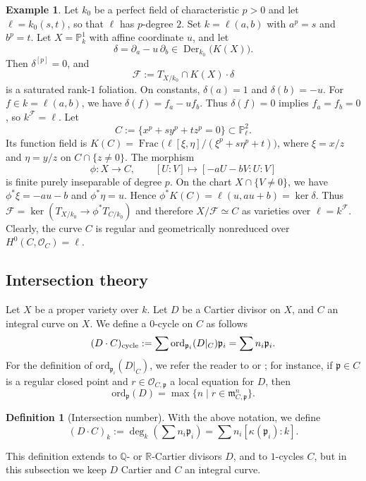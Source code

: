 \documentclass[reqno,oneside]{amsart}
\theoremstyle{definition}
\newtheorem{definition}[theorem]{Definition}
\newtheorem{example}[theorem]{Example}
\theoremstyle{plain}
\numberwithin{equation}{section}
\begin{document}
\begin{example}\label{example-foliation-geo-nonred-curve}
  Let $k_0$ be a perfect field of characteristic $p>0$ and let $\ell=k_0(s,t)$, so that $\ell$ has $p$-degree $2$.
  Set $k=\ell(a,b)$ with $a^p=s$ and $b^p=t$.
  Let $X=\mathbb P^1_k$ with affine coordinate $u$, and let
  \[
    \delta=\partial_a-u\,\partial_b\in\operatorname{Der}_{k_0}\bigl(K(X)\bigr).
  \]
  Then $\delta^{[p]}=0$, and
  \[
    \mathcal F:=T_{X/k_0}\cap K(X)\cdot\delta
  \]
  is a saturated rank-$1$ foliation.
  On constants, $\delta(a)=1$ and $\delta(b)=-u$.
  For $f\in k=\ell(a,b)$, we have $\delta(f)=f_a-u f_b$.
  Thus $\delta(f)=0$ implies $f_a=f_b=0$, so $k^{\mathcal F}=\ell$.
  Let
  \[
    C:=\bigl\{x^p+sy^p+tz^p=0\bigr\}\subset\mathbb P^2_\ell.
  \]
  Its function field is $K(C)=\operatorname{Frac}\bigl(\ell[\xi,\eta]/(\xi^p+s\eta^p+t)\bigr)$, where $\xi=x/z$ and $\eta=y/z$ on $C\cap\{z\ne0\}$.
  The morphism
  \[
  \phi\colon X\to C, \qquad [U:V]\mapsto [-aU-bV:U:V]
  \]
  is finite purely inseparable of degree $p$.
  On the chart $X\cap\{V\ne0\}$, we have $\phi^*\xi=-au-b$ and $\phi^*\eta=u$.
  Hence $\phi^*K(C)=\ell(u,au+b)=\ker\delta$.
  Thus $\mathcal F=\ker(T_{X/k_0}\to\phi^*T_{C/k_0})$ and therefore $X/\mathcal F\simeq C$ as varieties over $\ell=k^{\mathcal F}$.
  Clearly, the curve $C$ is regular and geometrically nonreduced over $H^0(C,\mathcal O_C)=\ell$. 
\end{example}



\subsection{Intersection theory}\label{subsection-intersection}%
  Let $X$ be a proper variety over $k$.
  Let $D$ be a Cartier divisor on $X$, and $C$ an integral curve on $X$.
  We define a 0-cycle on $C$ as follows \[
    (D \cdot C)_{\rm cycle} := \sum \mathrm{ord}_{\mathfrak p_i}(D|_{C}) \mathfrak p_i = \sum n_i \mathfrak p_i .
  \]
  For the definition of $\mathrm{ord}_{\mathfrak p_i}(D|_{C})$, we refer the reader to \cite[\S1.2]{fulton_intersection_theory} or \cite[\S7.2.1]{Liu-AGAC};
  for instance, if $\mathfrak p\in C$ is a regular closed point and $r\in \mathcal{O}_{C,\mathfrak p}$ a local equation for $D$, then 
  \[
    \mathrm{ord}_\mathfrak p(D) = \max \{ n \mid r \in \mathfrak m^n_{C,\mathfrak p}\}.
  \]
\begin{definition}[Intersection number]\label{definition-intersection-number}
  With the above notation, we define
  \[
    (D\cdot C)_k := \deg_k(\sum n_i \mathfrak p_i) = \sum n_i [\kappa(\mathfrak p_i):k].
  \]
\end{definition}
  This definition extends to $\mathbb{Q}$- or $\mathbb{R}$-Cartier divisors $D$, and to $1$-cycles $C$,
  but in this subsection we keep $D$ Cartier and $C$ an integral curve.
  
\end{document}
